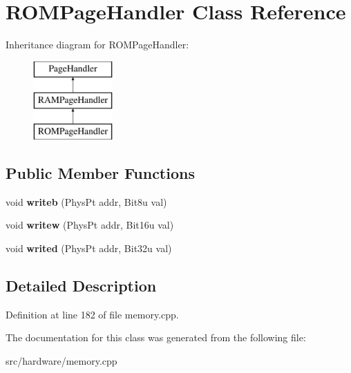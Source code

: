 \hypertarget{classROMPageHandler}{\section{R\-O\-M\-Page\-Handler Class Reference}
\label{classROMPageHandler}
}
Inheritance diagram for R\-O\-M\-Page\-Handler\-:\begin{figure}[H]
\begin{center}
\leavevmode
\includegraphics[height=3.000000cm]{classROMPageHandler}
\end{center}
\end{figure}
\subsection*{Public Member Functions}
\begin{DoxyCompactItemize}
\item 
\hypertarget{classROMPageHandler_a1c0198f154f15547987f5719099c7337}{void {\bfseries writeb} (Phys\-Pt addr, Bit8u val)}\label{classROMPageHandler_a1c0198f154f15547987f5719099c7337}

\item 
\hypertarget{classROMPageHandler_a995ec4ce3bbd008b9202876e7685fc31}{void {\bfseries writew} (Phys\-Pt addr, Bit16u val)}\label{classROMPageHandler_a995ec4ce3bbd008b9202876e7685fc31}

\item 
\hypertarget{classROMPageHandler_ace00a50edbd7ef46d48ee19755500193}{void {\bfseries writed} (Phys\-Pt addr, Bit32u val)}\label{classROMPageHandler_ace00a50edbd7ef46d48ee19755500193}

\end{DoxyCompactItemize}


\subsection{Detailed Description}


Definition at line 182 of file memory.\-cpp.



The documentation for this class was generated from the following file\-:\begin{DoxyCompactItemize}
\item 
src/hardware/memory.\-cpp\end{DoxyCompactItemize}
